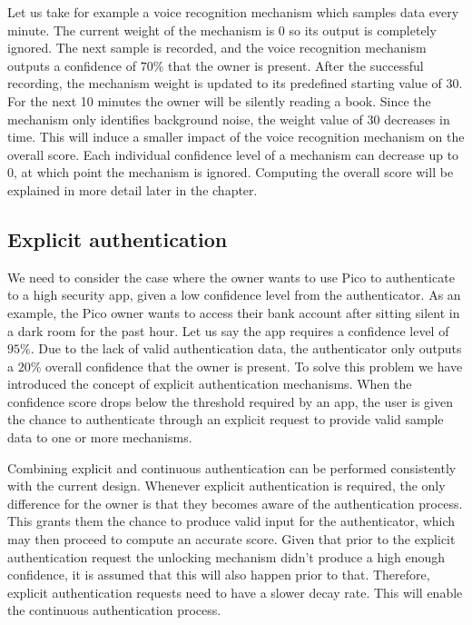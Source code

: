 Let us take for example a voice recognition mechanism which samples data every minute. The current weight of the mechanism is 0 so its output is completely ignored. The next sample is recorded, and the voice recognition mechanism outputs a confidence of $70\%$ that the owner is present. After the successful recording, the mechanism weight is updated to its predefined starting value of 30. For the next 10 minutes the owner will be silently reading a book. Since the mechanism only identifies background noise, the weight value of 30 decreases in time. This will induce a smaller impact of the voice recognition mechanism on the overall score. Each individual confidence level of a mechanism can decrease up to 0, at which point the mechanism is ignored. Computing the overall score will be explained in more detail later in the chapter.

\subsection{Explicit authentication}
We need to consider the case where the owner wants to use Pico to authenticate to a high security app, given a low confidence level from the authenticator. As an example, the Pico owner wants to access their bank account after sitting silent in a dark room for the past hour. Let us say the app requires a confidence level of $95\%$. Due to the lack of valid authentication data, the authenticator only outputs a $20\%$ overall confidence that the owner is present. To solve this problem we have introduced the concept of explicit authentication mechanisms. When the confidence score drops below the threshold required by an app, the user is given the chance to authenticate through an explicit request to provide valid sample data to one or more mechanisms.

Combining explicit and continuous authentication can be performed consistently with the current design. Whenever explicit authentication is required, the only difference for the owner is that they becomes aware of the authentication process. This grants them the chance to produce valid input for the authenticator, which may then proceed to compute an accurate score. Given that prior to the explicit authentication request the unlocking mechanism didn't produce a high enough confidence, it is assumed that this will also happen prior to that. Therefore, explicit authentication requests need to have a slower decay rate. This will enable the continuous authentication process.

